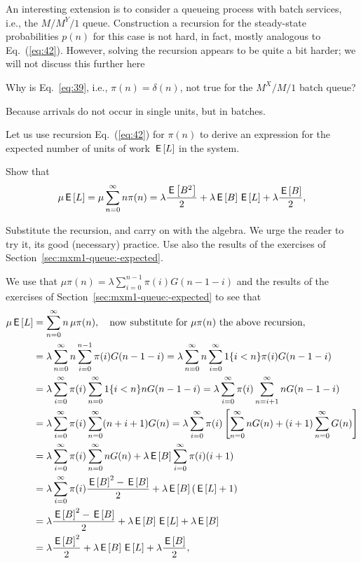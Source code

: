 An interesting extension is to consider a queueing process with batch
services, i.e., the $M/M^Y/1$ queue. Construction a recursion for the
steady-state probabilities $p(n)$ for this case is not hard, in fact,
mostly analogous to Eq.~(\ref{eq:42}).  However, solving the recursion
appears to be quite a bit harder; we will not discuss this further here

\begin{exercise}
  Why is Eq.~\eqref{eq:39}, i.e., $\pi(n)=\delta(n)$, not true for the
  $M^X/M/1$ batch queue?
\begin{solution}
 Because arrivals do not occur in single units, but in batches.
\end{solution}
\end{exercise}

Let us use  recursion Eq.~(\ref{eq:42}) for $\pi(n)$ to
 derive an expression for the expected number of units of work $\,\mathsf{E}\left[L\right]$
 in the system.
\begin{exercise}
 Show that
\begin{equation}\label{eq:67}
  \mu \,\mathsf{E}\left[L\right] =\mu \sum_{n=0}^\infty n \pi(n) = \lambda \frac{\,\mathsf{E}\left[B^2\right]}2  + \lambda \,\mathsf{E}\left[B\right] \,\mathsf{E}\left[L\right] +\lambda \frac{\,\mathsf{E}\left[B\right]}2,
\end{equation}
\begin{hint}
Substitute the
  recursion, and carry on with the algebra. We urge the reader to try
  it, its good (necessary) practice.  Use also the results of the
  exercises of Section~\ref{sec:mxm1-queue:-expected}.  
\end{hint}
\begin{solution}
  We use that $\mu \pi(n) =\lambda \sum_{i=0}^{n-1} \pi(i) G(n-1-i)$
  and the results of the exercises of
  Section~\ref{sec:mxm1-queue:-expected} to see that
\begin{align*}
  \mu \,\mathsf{E}\left[L\right]
  &=\sum_{n=0}^\infty n\, \mu \pi(n), \quad \text{now substitute for $\mu \pi(n)$ the above recursion}, \\
& =\lambda \sum_{n=0}^\infty n \sum_{i=0}^{n-1} \pi(i) G(n-1-i) 
  =\lambda \sum_{n=0}^\infty n \sum_{i=0}^\infty 1\{i<n\} \pi(i) G(n-1-i) \\
& =\lambda \sum_{i=0}^\infty \pi(i) \sum_{n=0}^\infty 1\{i<n\} n G(n-1-i) 
  =\lambda \sum_{i=0}^\infty \pi(i) \sum_{n=i+1}^\infty n G(n-1-i) \\
& =\lambda \sum_{i=0}^\infty \pi(i) \sum_{n=0}^\infty (n+i+1) G(n) 
  =\lambda \sum_{i=0}^\infty \pi(i) \left[\sum_{n=0}^\infty n G(n) +(i+1) \sum_{n=0}^\infty G(n)\right]  \\
  &=\lambda \sum_{i=0}^\infty \pi(i)\sum_{n=0}^\infty n G(n) +\lambda  \,\mathsf{E}\left[B\right] \sum_{i=0}^\infty \pi(i) (i+1)  \\ 
  &=\lambda \sum_{i=0}^\infty \pi(i) \frac{\,\mathsf{E}\left[B\right]^2 -\,\mathsf{E}\left[B\right]}2  + \lambda \,\mathsf{E}\left[B\right] (\,\mathsf{E}\left[L\right] +1)  \\ 
  &= \lambda \frac{\,\mathsf{E}\left[B\right]^2 -\,\mathsf{E}\left[B\right]}2  + \lambda \,\mathsf{E}\left[B\right] \,\mathsf{E}\left[L\right] +\lambda \,\mathsf{E}\left[B\right] \\
  &= \lambda \frac{\,\mathsf{E}\left[B\right]^2 }2  + \lambda \,\mathsf{E}\left[B\right] \,\mathsf{E}\left[L\right] +\lambda \frac{\,\mathsf{E}\left[B\right]}2,
\end{align*}
\end{solution}
\end{exercise}

